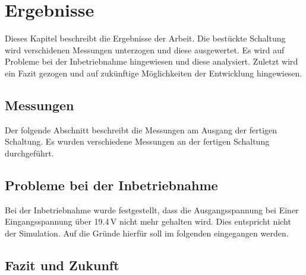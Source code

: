 \chapter{Ergebnisse} 
Dieses Kapitel beschreibt die Ergebnisse der Arbeit.
Die bestückte Schaltung wird verschidenen Messungen unterzogen und diese 
ausgewertet.
Es wird auf Probleme bei der Inbetriebnahme hingewiesen und diese analysiert.
Zuletzt wird ein Fazit gezogen und auf zukünftige Möglichkeiten der Entwicklung
hingewiesen.

\section{Messungen}
Der folgende Abschnitt beschreibt die Messungen am Ausgang der fertigen 
Schaltung.
Es wurden verschiedene Messungen an der fertigen Schaltung durchgeführt.

\section{Probleme bei der Inbetriebnahme}
Bei der Inbetriebnahme wurde festgestellt, dass die Ausgangsspannung bei 
Einer Eingangsspannung über \num{19,4}\,\si{\volt} nicht mehr gehalten wird.
Dies entspricht nicht der Simulation. Auf die Gründe hierfür soll im folgenden
eingegangen werden.

\section{Fazit und Zukunft} 